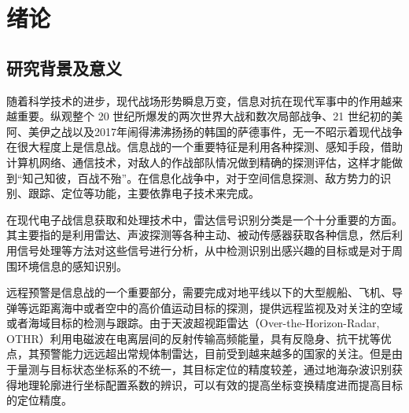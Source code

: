 \chapter{绪论}
\section{研究背景及意义}







随着科学技术的进步，现代战场形势瞬息万变，信息对抗在现代军事中的作用越来越重要。纵观整个 20 世纪所爆发的两次世界大战和数次局部战争、21 世纪初的美阿、美伊之战以及2017年闹得沸沸扬扬的韩国的萨德事件，无一不昭示着现代战争在很大程度上是信息战。信息战的一个重要特征是利用各种探测、感知手段，借助计算机网络、通信技术，对敌人的作战部队情况做到精确的探测评估，这样才能做到“知己知彼，百战不殆”。在信息化战争中，对于空间信息探测、敌方势力的识别、跟踪、定位等功能，主要依靠电子技术来完成。

在现代电子战信息获取和处理技术中，雷达信号识别分类是一个十分重要的方面。其主要指的是利用雷达、声波探测等各种主动、被动传感器获取各种信息，然后利用信号处理等方法对这些信号进行分析，从中检测识别出感兴趣的目标或是对于周围环境信息的感知识别。

远程预警是信息战的一个重要部分，需要完成对地平线以下的大型舰船、飞机、导弹等远距离海中或者空中的高价值运动目标的探测，提供远程监视及对关注的空域或者海域目标的检测与跟踪。由于天波超视距雷达（Over-the-Horizon-Radar, OTHR）利用电磁波在电离层间的反射传输高频能量，具有反隐身、抗干扰等优点，其预警能力远远超出常规体制雷达，目前受到越来越多的国家的关注。但是由于量测与目标状态坐标系的不统一，其目标定位的精度较差，通过地海杂波识别获得地理轮廓进行坐标配置系数的辨识，可以有效的提高坐标变换精度进而提高目标的定位精度。

